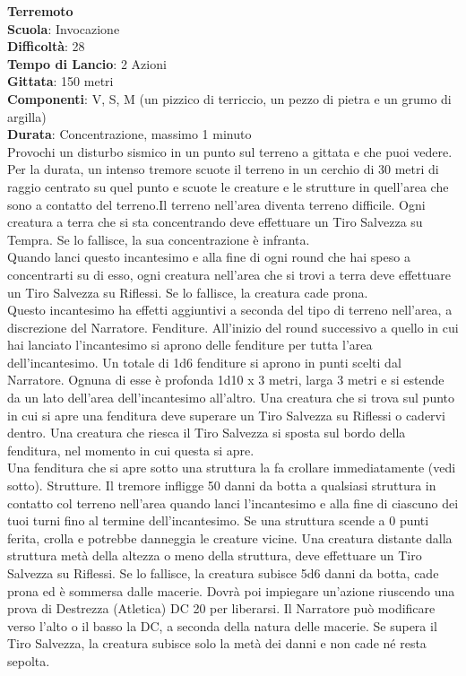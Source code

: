 \begin{multicols}{2}
\medskip\textbf{Terremoto}\\
\textbf{Scuola}: Invocazione\\
\textbf{Difficoltà}: 28\\
\textbf{Tempo di Lancio}: 2 Azioni\\
\textbf{Gittata}: 150 metri\\
\textbf{Componenti}: V, S, M (un pizzico di terriccio, un pezzo di pietra e un grumo di argilla)\\
\textbf{Durata}: Concentrazione, massimo 1 minuto\\
Provochi un disturbo sismico in un punto sul terreno a gittata e che puoi vedere. Per la durata, un intenso tremore scuote il terreno in un cerchio di 30 metri di raggio centrato su quel punto e scuote le creature e le strutture in quell'area che sono a contatto del terreno.Il terreno nell'area diventa terreno difficile. Ogni creatura a terra che si sta concentrando deve effettuare un Tiro Salvezza su Tempra. Se lo fallisce, la sua concentrazione è infranta.\\
Quando lanci questo incantesimo e alla fine di ogni round che hai speso a concentrarti su di esso, ogni creatura nell'area che si trovi a terra deve effettuare un Tiro Salvezza su Riflessi. Se lo fallisce, la creatura cade prona.\\
Questo incantesimo ha effetti aggiuntivi a seconda del tipo di terreno nell'area, a discrezione del Narratore. Fenditure. All'inizio del round successivo a quello in cui hai lanciato l'incantesimo si aprono delle fenditure per tutta l'area dell'incantesimo. Un totale di 1d6 fenditure si aprono in punti scelti dal Narratore. Ognuna di esse è profonda 1d10 x 3 metri, larga 3 metri e si estende da un lato dell'area dell'incantesimo all'altro. Una creatura che si trova sul punto in cui si apre una fenditura deve superare un Tiro Salvezza su Riflessi o cadervi dentro. Una creatura che riesca il Tiro Salvezza si sposta sul bordo della fenditura, nel momento in cui questa si apre.\\
Una fenditura che si apre sotto una struttura la fa crollare immediatamente (vedi sotto). Strutture. Il tremore infligge 50 danni da botta a qualsiasi struttura in contatto col terreno nell'area quando lanci l'incantesimo e alla fine di ciascuno dei tuoi turni fino al termine dell'incantesimo. Se una struttura scende a 0 punti ferita, crolla e potrebbe danneggia le creature vicine. Una creatura distante dalla struttura metà della altezza o meno della struttura, deve effettuare un Tiro Salvezza su Riflessi. Se lo fallisce, la creatura subisce 5d6 danni da botta, cade prona ed è sommersa dalle macerie. Dovrà poi impiegare un'azione riuscendo una prova di Destrezza (Atletica) DC 20 per liberarsi. Il Narratore può modificare verso l'alto o il basso la DC, a seconda della natura delle macerie. Se supera il Tiro Salvezza, la creatura subisce solo la metà dei danni e non cade né resta sepolta.


\end{multicols}
